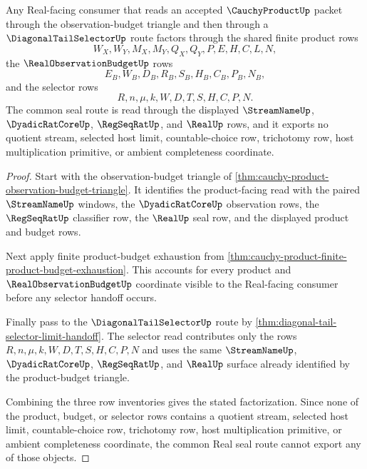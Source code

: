\begin{theorem}
\label{thm:cauchy-product-budget-triangle-selector-compatibility}
Any Real-facing consumer that reads an accepted $\CauchyProductUp$ packet through the observation-budget triangle and then through a $\DiagonalTailSelectorUp$ route factors through the shared finite product rows
$$
W_X,W_Y,M_X,M_Y,Q_X,Q_Y,P,E,H,C,L,N,
$$
the $\RealObservationBudgetUp$ rows
$$
E_B,W_B,D_B,R_B,S_B,H_B,C_B,P_B,N_B,
$$
and the selector rows
$$
R,n,\mu,k,W,D,T,S,H,C,P,N.
$$
The common seal route is read through the displayed $\StreamNameUp$, $\DyadicRatCoreUp$, $\RegSeqRatUp$, and $\RealUp$ rows, and it exports no quotient stream, selected host limit, countable-choice row, trichotomy row, host multiplication primitive, or ambient completeness coordinate.
\end{theorem}
\begin{proof}
Start with the observation-budget triangle of \autoref{thm:cauchy-product-observation-budget-triangle}. It identifies the product-facing read with the paired $\StreamNameUp$ windows, the $\DyadicRatCoreUp$ observation rows, the $\RegSeqRatUp$ classifier row, the $\RealUp$ seal row, and the displayed product and budget rows.

Next apply finite product-budget exhaustion from \autoref{thm:cauchy-product-finite-product-budget-exhaustion}. This accounts for every product and $\RealObservationBudgetUp$ coordinate visible to the Real-facing consumer before any selector handoff occurs.

Finally pass to the $\DiagonalTailSelectorUp$ route by \autoref{thm:diagonal-tail-selector-limit-handoff}. The selector read contributes only the rows $R,n,\mu,k,W,D,T,S,H,C,P,N$ and uses the same $\StreamNameUp$, $\DyadicRatCoreUp$, $\RegSeqRatUp$, and $\RealUp$ surface already identified by the product-budget triangle.

Combining the three row inventories gives the stated factorization. Since none of the product, budget, or selector rows contains a quotient stream, selected host limit, countable-choice row, trichotomy row, host multiplication primitive, or ambient completeness coordinate, the common Real seal route cannot export any of those objects.
\end{proof}

